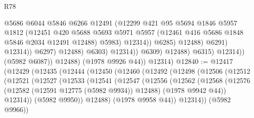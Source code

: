 \begin{lexlean}{R78}
\begin{coremodule}
                                            @5686
                                            @6044
                                            @5846
                                            @6266
                                            @12491
                                            (@12299
                                              @421
                                              @95
                                              @5694
                                              @1846
                                              @5957
                                              @1812
                                              (@12451
                                                @420
                                                @5688
                                                @5693
                                                @5971
                                                @5957
                                                (@12461 @416 @5686 @1848 @5846 @2034 @12491 @12488)
                                                @5983)
                                              @12314))
                                          @6285)
                                        @12488)
                                      @6291)
                                    @12314))
                                @6297)
                              @12488)
                            @6303)
                          @12314))
                      @6309)
                    @12488)
                  @6315)
                @12314))
            (@5982 @6087))
          @12488)
        (@1978 @9926 @44))
      @12314)
@12840 := @12417
    (@12429
      (@12435
        (@12444
          (@12450
            (@12460
              (@12492
                (@12498
                  (@12506
                    (@12512
                      (@12521
                        (@12527
                          (@12533
                            (@12541
                              (@12547
                                (@12556
                                  (@12562
                                    (@12568
                                      (@12576
                                        (@12582 (@12591 @12775 (@5982 @9934)) @12488)
                                        (@1978 @9942 @44))
                                      @12314))
                                  (@5982 @9950))
                                @12488)
                              (@1978 @9958 @44))
                            @12314))
                        (@5982 @9966))

\end{coremodule}
\end{lexlean}
